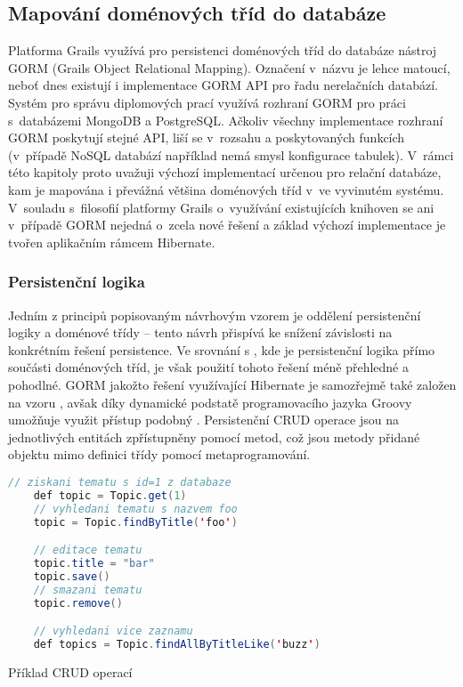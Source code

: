 \subsection{Mapování doménových tříd do databáze}
Platforma Grails využívá pro persistenci doménových tříd do databáze nástroj GORM (Grails Object Relational Mapping). Označení  v~názvu je lehce matoucí, neboť dnes existují i implementace GORM API pro řadu nerelačních databází. Systém pro správu diplomových prací využívá rozhraní GORM pro práci s~databázemi MongoDB a PostgreSQL. Ačkoliv všechny implementace rozhraní GORM poskytují stejné API, liší se v~rozsahu a poskytovaných funkcích (v~případě NoSQL databází například nemá smysl konfigurace tabulek). V~rámci této kapitoly proto uvažuji výchozí implementací určenou pro relační databáze, kam je mapována i převážná většina doménových tříd v~ve vyvinutém systému. V~souladu s~filosofií platformy Grails o~využívání existujících knihoven se ani v~případě GORM nejedná o~zcela nové řešení a základ výchozí implementace je tvořen aplikačním rámcem Hibernate.

\subsubsection{\textbf{Persistenční logika}}
Jedním z principů popisovaným návrhovým vzorem  je oddělení persistenční logiky a doménové třídy -- tento návrh přispívá ke snížení závislosti na konkrétním řešení persistence. Ve srovnání s , kde je persistenční logika přímo součásti doménových tříd, je však použití tohoto řešení méně přehledné a pohodlné. GORM jakožto řešení využívající Hibernate je samozřejmě také založen na vzoru , avšak díky dynamické podstatě programovacího jazyka Groovy umožňuje využit přístup podobný . Persistenční CRUD operace jsou na jednotlivých entitách zpřístupněny pomocí  metod, což jsou metody přidané objektu mimo definici třídy pomocí metaprogramování.

\begin{example}
\centering
\begin{lstlisting}[language=Java]
    // ziskani tematu s id=1 z databaze
    def topic = Topic.get(1)
    // vyhledani tematu s nazvem foo
    topic = Topic.findByTitle('foo')

    // editace tematu
    topic.title = "bar"
    topic.save()
    // smazani tematu
    topic.remove()

    // vyhledani vice zaznamu
    def topics = Topic.findAllByTitleLike('buzz')
\end{lstlisting}
\caption{Příklad CRUD operací}
\end{example}


